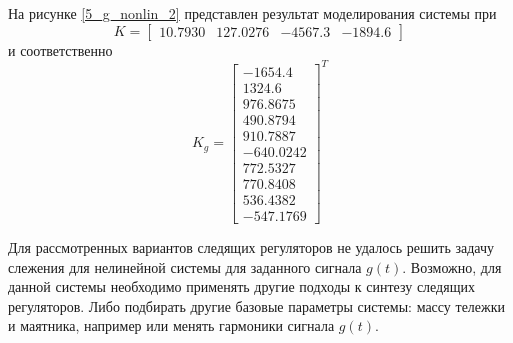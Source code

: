 На рисунке \ref{5_g_nonlin_2} представлен результат моделирования системы при 
\begin{equation}
	K = \begin{bmatrix}
		10.7930& 127.0276& -4567.3 &-1894.6
	\end{bmatrix}
\end{equation}
и соответственно
\begin{equation}
	K_g = \begin{bmatrix}
		-1654.4\\	1324.6\\	976.8675\\	490.8794\\	910.7887\\	-640.0242\\	772.5327\\	770.8408\\	536.4382\\	-547.1769
	\end{bmatrix}^T
\end{equation}


Для рассмотренных вариантов следящих регуляторов не удалось решить задачу слежения для нелинейной системы для заданного сигнала $g(t)$. Возможно, для данной системы необходимо применять другие подходы к синтезу следящих регуляторов. Либо подбирать другие базовые параметры системы: массу тележки и маятника, например или менять гармоники сигнала $g(t)$. 

\endinput
